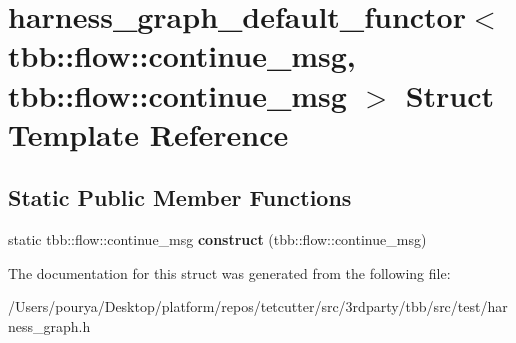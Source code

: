 \hypertarget{structharness__graph__default__functor_3_01tbb_1_1flow_1_1continue__msg_00_01tbb_1_1flow_1_1continue__msg_01_4}{}\section{harness\+\_\+graph\+\_\+default\+\_\+functor$<$ tbb\+:\+:flow\+:\+:continue\+\_\+msg, tbb\+:\+:flow\+:\+:continue\+\_\+msg $>$ Struct Template Reference}
\label{structharness__graph__default__functor_3_01tbb_1_1flow_1_1continue__msg_00_01tbb_1_1flow_1_1continue__msg_01_4}
\subsection*{Static Public Member Functions}
\begin{DoxyCompactItemize}
\item 
\hypertarget{structharness__graph__default__functor_3_01tbb_1_1flow_1_1continue__msg_00_01tbb_1_1flow_1_1continue__msg_01_4_ae6a25b22a1bd892b5cdab93cbc60f483}{}static tbb\+::flow\+::continue\+\_\+msg {\bfseries construct} (tbb\+::flow\+::continue\+\_\+msg)\label{structharness__graph__default__functor_3_01tbb_1_1flow_1_1continue__msg_00_01tbb_1_1flow_1_1continue__msg_01_4_ae6a25b22a1bd892b5cdab93cbc60f483}

\end{DoxyCompactItemize}


The documentation for this struct was generated from the following file\+:\begin{DoxyCompactItemize}
\item 
/\+Users/pourya/\+Desktop/platform/repos/tetcutter/src/3rdparty/tbb/src/test/harness\+\_\+graph.\+h\end{DoxyCompactItemize}
